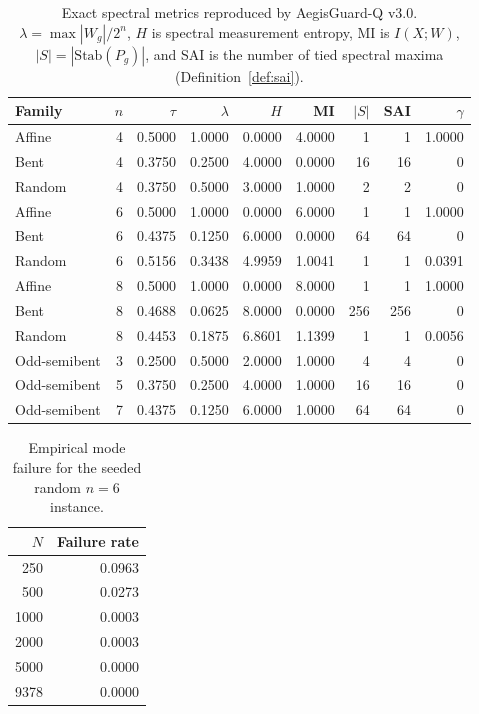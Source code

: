 \documentclass[10pt,twocolumn]{article}
\theoremstyle{definition}
\begin{document}
\begin{table}[t]
\centering
\caption{Exact spectral metrics reproduced by AegisGuard-Q v3.0. $\lambda = \max|W_g|/2^n$, $H$ is spectral measurement entropy, MI is $I(X;W)$, $|S| = |\mathrm{Stab}(P_g)|$, and SAI is the number of tied spectral maxima (Definition~\ref{def:sai}).}
\label{tab:main}
\begin{tabular}{lrrrrrrrr}
\toprule
Family & $n$ & $\tau$ & $\lambda$ & $H$ & MI & $|S|$ & SAI & $\gamma$ \\
\midrule
Affine & 4 & 0.5000 & 1.0000 & 0.0000 & 4.0000 & 1 & 1 & 1.0000 \\
Bent & 4 & 0.3750 & 0.2500 & 4.0000 & 0.0000 & 16 & 16 & 0 \\
Random & 4 & 0.3750 & 0.5000 & 3.0000 & 1.0000 & 2 & 2 & 0 \\
Affine & 6 & 0.5000 & 1.0000 & 0.0000 & 6.0000 & 1 & 1 & 1.0000 \\
Bent & 6 & 0.4375 & 0.1250 & 6.0000 & 0.0000 & 64 & 64 & 0 \\
Random & 6 & 0.5156 & 0.3438 & 4.9959 & 1.0041 & 1 & 1 & 0.0391 \\
Affine & 8 & 0.5000 & 1.0000 & 0.0000 & 8.0000 & 1 & 1 & 1.0000 \\
Bent & 8 & 0.4688 & 0.0625 & 8.0000 & 0.0000 & 256 & 256 & 0 \\
Random & 8 & 0.4453 & 0.1875 & 6.8601 & 1.1399 & 1 & 1 & 0.0056 \\
Odd-semibent & 3 & 0.2500 & 0.5000 & 2.0000 & 1.0000 & 4 & 4 & 0 \\
Odd-semibent & 5 & 0.3750 & 0.2500 & 4.0000 & 1.0000 & 16 & 16 & 0 \\
Odd-semibent & 7 & 0.4375 & 0.1250 & 6.0000 & 1.0000 & 64 & 64 & 0 \\
\bottomrule
\end{tabular}
\end{table}

\begin{table}[t]
\centering
\caption{Empirical mode failure for the seeded random $n = 6$ instance.}
\label{tab:mode}
\begin{tabular}{rr}
\toprule
$N$ & Failure rate \\
\midrule
250 & 0.0963 \\
500 & 0.0273 \\
1000 & 0.0003 \\
2000 & 0.0003 \\
5000 & 0.0000 \\
9378 & 0.0000 \\
\bottomrule
\end{tabular}
\end{table}
\end{document}
